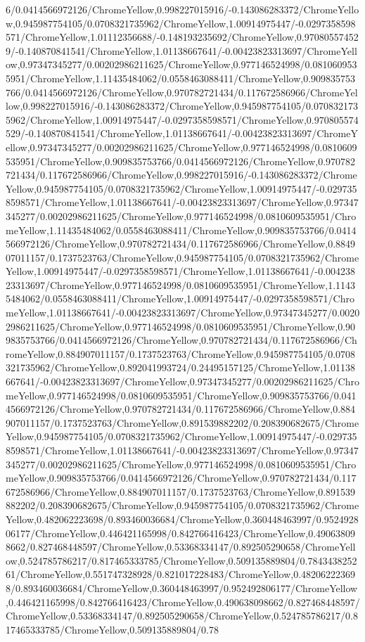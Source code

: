 {\begin{tikzternal}
{6/0.0414566972126/ChromeYellow,0.998227015916/-0.143086283372/ChromeYellow,0.945987754105/0.0708321735962/ChromeYellow,1.00914975447/-0.0297358598571/ChromeYellow,1.01112356688/-0.148193235692/ChromeYellow,0.970805574529/-0.140870841541/ChromeYellow,1.01138667641/-0.00423823313697/ChromeYellow,0.97347345277/0.00202986211625/ChromeYellow,0.977146524998/0.0810609535951/ChromeYellow,1.11435484062/0.0558463088411/ChromeYellow,0.909835753766/0.0414566972126/ChromeYellow,0.970782721434/0.117672586966/ChromeYellow,0.998227015916/-0.143086283372/ChromeYellow,0.945987754105/0.0708321735962/ChromeYellow,1.00914975447/-0.0297358598571/ChromeYellow,0.970805574529/-0.140870841541/ChromeYellow,1.01138667641/-0.00423823313697/ChromeYellow,0.97347345277/0.00202986211625/ChromeYellow,0.977146524998/0.0810609535951/ChromeYellow,0.909835753766/0.0414566972126/ChromeYellow,0.970782721434/0.117672586966/ChromeYellow,0.998227015916/-0.143086283372/ChromeYellow,0.945987754105/0.0708321735962/ChromeYellow,1.00914975447/-0.0297358598571/ChromeYellow,1.01138667641/-0.00423823313697/ChromeYellow,0.97347345277/0.00202986211625/ChromeYellow,0.977146524998/0.0810609535951/ChromeYellow,1.11435484062/0.0558463088411/ChromeYellow,0.909835753766/0.0414566972126/ChromeYellow,0.970782721434/0.117672586966/ChromeYellow,0.884907011157/0.1737523763/ChromeYellow,0.945987754105/0.0708321735962/ChromeYellow,1.00914975447/-0.0297358598571/ChromeYellow,1.01138667641/-0.00423823313697/ChromeYellow,0.977146524998/0.0810609535951/ChromeYellow,1.11435484062/0.0558463088411/ChromeYellow,1.00914975447/-0.0297358598571/ChromeYellow,1.01138667641/-0.00423823313697/ChromeYellow,0.97347345277/0.00202986211625/ChromeYellow,0.977146524998/0.0810609535951/ChromeYellow,0.909835753766/0.0414566972126/ChromeYellow,0.970782721434/0.117672586966/ChromeYellow,0.884907011157/0.1737523763/ChromeYellow,0.945987754105/0.0708321735962/ChromeYellow,0.892041993724/0.24495157125/ChromeYellow,1.01138667641/-0.00423823313697/ChromeYellow,0.97347345277/0.00202986211625/ChromeYellow,0.977146524998/0.0810609535951/ChromeYellow,0.909835753766/0.0414566972126/ChromeYellow,0.970782721434/0.117672586966/ChromeYellow,0.884907011157/0.1737523763/ChromeYellow,0.891539882202/0.208390682675/ChromeYellow,0.945987754105/0.0708321735962/ChromeYellow,1.00914975447/-0.0297358598571/ChromeYellow,1.01138667641/-0.00423823313697/ChromeYellow,0.97347345277/0.00202986211625/ChromeYellow,0.977146524998/0.0810609535951/ChromeYellow,0.909835753766/0.0414566972126/ChromeYellow,0.970782721434/0.117672586966/ChromeYellow,0.884907011157/0.1737523763/ChromeYellow,0.891539882202/0.208390682675/ChromeYellow,0.945987754105/0.0708321735962/ChromeYellow,0.482062223698/0.893460036684/ChromeYellow,0.360448463997/0.952492806177/ChromeYellow,0.446421165998/0.842766416423/ChromeYellow,0.490638098662/0.827468448597/ChromeYellow,0.53368334147/0.892505290658/ChromeYellow,0.524785786217/0.817465333785/ChromeYellow,0.509135889804/0.784343825261/ChromeYellow,0.551747328928/0.821017228483/ChromeYellow,0.482062223698/0.893460036684/ChromeYellow,0.360448463997/0.952492806177/ChromeYellow,0.446421165998/0.842766416423/ChromeYellow,0.490638098662/0.827468448597/ChromeYellow,0.53368334147/0.892505290658/ChromeYellow,0.524785786217/0.817465333785/ChromeYellow,0.509135889804/0.78}
\end{tikzternal}}
